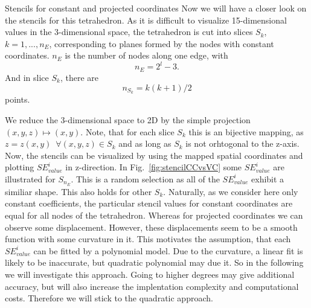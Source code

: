 \documentclass[a4paper,11pt,reqno]{amsart}
\numberwithin{figure}{section}
\numberwithin{table}{section}
\numberwithin{figure}{subsection}
\def\si{SE_{value}^i}
\begin{document}
\begin{section}{Stencils for constant and projected coordinates}
Now we will have a closer look on the stencils for this tetrahedron. As it is difficult 
to visualize 15-dimensional values in the 3-dimensional space, the tetrahedron is
cut into slices $S_k$, $k = 1,...,n_E$, corresponding to planes formed by the nodes
with constant coordinates.
$n_E$ is the number of nodes along one edge, with
\begin{equation}
n_E = 2^l-3.
\end{equation}
And in slice $S_k$, there are
\begin{equation}
n_{S_k} = k(k+1)/2
\end{equation}
points.

We reduce the 3-dimensional space to 2D by the simple projection $(x,y,z) \mapsto (x,y)$.
Note, that for each slice $S_k$ this is an bijective mapping, as 
$z = z(x,y)\enspace\forall(x,y,z)\in S_k$ and as long as $S_k$ is not orhtogonal to the
z-axis. Now, the stencils can be visualized by using
the mapped spatial coordinates and plotting $\si$ in z-direction. 
In Fig.~\ref{fig:stencilCCvsVC} some $\si$ are illustrated for $S_{n_E}$. This is a
random selection as all of the $\si$ exhibit a similiar shape. This also holds for other
$S_k$.
Naturally, as we consider here only constant coefficients, the particular stencil values 
for constant coordinates are equal for all nodes of the tetrahedron. Whereas for projected
coordinates we can observe some displacement. However, these displacements seem to
be a smooth function with some curvature in it. This motivates the assumption, that each
$\si$ can be fitted by a polynomial model. Due to the curvature, a linear fit is likely 
to be inaccurate, but quadratic polynomial may due it. So in the following we will 
investigate this approach.
Going to higher degrees may give additional accuracy, but will also increase the 
implentation complexity and computational costs. Therefore we will stick to the 
quadratic approach.



\end{section}
\end{document}
